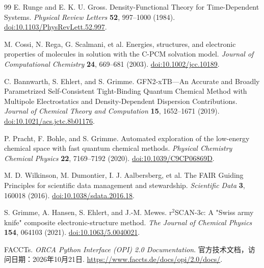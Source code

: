 \begin{thebibliography}{99}
E. Runge and E. K. U. Gross.
Density-Functional Theory for Time-Dependent Systems.
\emph{Physical Review Letters} \textbf{52}, 997--1000 (1984).
\href{https://doi.org/10.1103/PhysRevLett.52.997}{doi:10.1103/PhysRevLett.52.997}.

M. Cossi, N. Rega, G. Scalmani, et al.
Energies, structures, and electronic properties of molecules in solution with the C-PCM solvation model.
\emph{Journal of Computational Chemistry} \textbf{24}, 669--681 (2003).
\href{https://doi.org/10.1002/jcc.10189}{doi:10.1002/jcc.10189}.

C. Bannwarth, S. Ehlert, and S. Grimme.
GFN2-xTB---An Accurate and Broadly Parametrized Self-Consistent Tight-Binding Quantum Chemical Method with Multipole Electrostatics and Density-Dependent Dispersion Contributions.
\emph{Journal of Chemical Theory and Computation} \textbf{15}, 1652--1671 (2019).
\href{https://doi.org/10.1021/acs.jctc.8b01176}{doi:10.1021/acs.jctc.8b01176}.

P. Pracht, F. Bohle, and S. Grimme.
Automated exploration of the low-energy chemical space with fast quantum chemical methods.
\emph{Physical Chemistry Chemical Physics} \textbf{22}, 7169--7192 (2020).
\href{https://doi.org/10.1039/C9CP06869D}{doi:10.1039/C9CP06869D}.

M. D. Wilkinson, M. Dumontier, I. J. Aalbersberg, et al.
The FAIR Guiding Principles for scientific data management and stewardship.
\emph{Scientific Data} \textbf{3}, 160018 (2016).
\href{https://doi.org/10.1038/sdata.2016.18}{doi:10.1038/sdata.2016.18}.

S. Grimme, A. Hansen, S. Ehlert, and J.-M. Mewes.
r$^{2}$SCAN-3c: A "Swiss army knife" composite electronic-structure method.
\emph{The Journal of Chemical Physics} \textbf{154}, 064103 (2021).
\href{https://doi.org/10.1063/5.0040021}{doi:10.1063/5.0040021}.

FACCTs.
\emph{ORCA Python Interface (OPI) 2.0 Documentation}.
官方技术文档，访问日期：2026年10月21日.
\url{https://www.faccts.de/docs/opi/2.0/docs/}.

\end{thebibliography}
